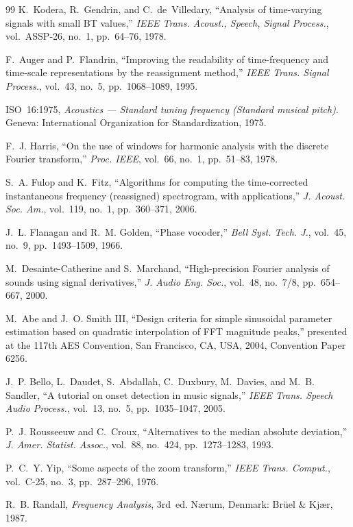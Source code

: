 \documentclass[10pt,a4paper,twocolumn]{article}
\begin{document}
\begin{thebibliography}{99}
K.~Kodera, R.~Gendrin, and C.~de~Villedary, ``Analysis of time-varying signals with small BT values,'' \emph{IEEE Trans. Acoust., Speech, Signal Process.}, vol.~ASSP-26, no.~1, pp.~64--76, 1978.

F.~Auger and P.~Flandrin, ``Improving the readability of time-frequency and time-scale representations by the reassignment method,'' \emph{IEEE Trans. Signal Process.}, vol.~43, no.~5, pp.~1068--1089, 1995.

ISO~16:1975, \emph{Acoustics --- Standard tuning frequency (Standard musical pitch)}. Geneva: International Organization for Standardization, 1975.

F.~J. Harris, ``On the use of windows for harmonic analysis with the discrete Fourier transform,'' \emph{Proc. IEEE}, vol.~66, no.~1, pp.~51--83, 1978.

S.~A. Fulop and K.~Fitz, ``Algorithms for computing the time-corrected instantaneous frequency (reassigned) spectrogram, with applications,'' \emph{J. Acoust. Soc. Am.}, vol.~119, no.~1, pp.~360--371, 2006.

J.~L. Flanagan and R.~M. Golden, ``Phase vocoder,'' \emph{Bell Syst. Tech. J.}, vol.~45, no.~9, pp.~1493--1509, 1966.

M.~Desainte-Catherine and S.~Marchand, ``High-precision Fourier analysis of sounds using signal derivatives,'' \emph{J. Audio Eng. Soc.}, vol.~48, no.~7/8, pp.~654--667, 2000.

M.~Abe and J.~O. Smith III, ``Design criteria for simple sinusoidal parameter estimation based on quadratic interpolation of FFT magnitude peaks,'' presented at the 117th AES Convention, San Francisco, CA, USA, 2004, Convention Paper 6256.

J.~P. Bello, L.~Daudet, S.~Abdallah, C.~Duxbury, M.~Davies, and M.~B. Sandler, ``A tutorial on onset detection in music signals,'' \emph{IEEE Trans. Speech Audio Process.}, vol.~13, no.~5, pp.~1035--1047, 2005.

P.~J. Rousseeuw and C.~Croux, ``Alternatives to the median absolute deviation,'' \emph{J. Amer. Statist. Assoc.}, vol.~88, no.~424, pp.~1273--1283, 1993.

P.~C.~Y. Yip, ``Some aspects of the zoom transform,'' \emph{IEEE Trans. Comput.}, vol.~C-25, no.~3, pp.~287--296, 1976.

R.~B. Randall, \emph{Frequency Analysis}, 3rd~ed. Nærum, Denmark: Brüel \& Kjær, 1987.


\end{thebibliography}
\end{document}
